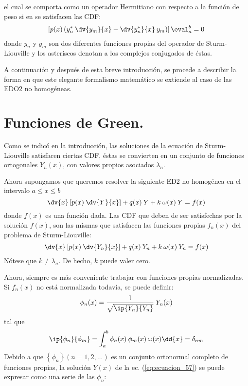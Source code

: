 el cual se comporta como un operador Hermitiano con respecto a la función de peso si en se satisfacen las CDF:
 \begin{align*}
\left[ p(x) \left( y_{n}^{*} \: \dv{y_{m}}{x} - \dv{y_{n}^{*}}{x} \: y_{m} \right) \right]\eval_{a}^{b} = 0
 \end{align*}
 donde $y_{n}$ y $y_{m}$ son dos diferentes funciones propias del operador de Sturm-Liouville y los asteriscos denotan a los complejos conjugados de éstas.
\par
A continuación y después de esta breve introducción, se procede a describir la forma en que este elegante formalismo matemático se extiende al caso de las EDO2 no homogéneas.

\section{Funciones de Green.}
Como se indicó en la introducción, las soluciones de la ecuación de Sturm-Liouville satisfacen ciertas CDF, éstas se convierten en un conjunto de funciones ortogonales $Y_{n} (x)$, con valores propios asociados $\lambda_{n}$.
\par
Ahora supongamos que queremos resolver la siguiente ED2 no homogénea en el intervalo $a \leq x \leq b$
\begin{equation}
\dv{x} \left[ p(x) \: \dv{Y}{x} \right] + q(x) \: Y + k \: \omega(x) \: Y = f(x)
\label{eq:ecuacion_57}
\end{equation}
donde $f(x)$ es una función dada. Las CDF que deben de ser satisfechas por la solución $f(x)$, son las mismas que  satisfacen las funciones propias $f_{n} (x)$ del problema de Sturm-Liouville:
\begin{align*}
\dv{x} \left[ p(x) \: \dv{Y_{n}}{x} \right] + q(x) \: Y_{n} + k \: \omega(x) \: Y_{n} = f(x)
\end{align*}
Nótese que $k \neq \lambda_{n}$. De hecho, $k$ puede valer cero.
\par
Ahora, siempre es más conveniente trabajar con funciones propias normalizadas. Si $f_{n} (x)$ no está normalizada todavía, se puede definir:
\begin{align*}
\phi_{n} (x) = \dfrac{1}{\sqrt{\ip{Y_{n}}{Y_{n}}}} \: Y_{n} (x)
\end{align*}
tal que
\begin{align*}
\ip{\phi_{n}}{\phi_{m}} = \int_{a}^{b} \phi_{n} (x) \: \phi_{m} (x) \: \omega (x) \dd{x} = \delta_{nm} 
\end{align*}
Debido a que  $\left\{ \phi_{n} \right\}(n = 1, 2, \ldots)$ es un conjunto ortonormal completo de funciones propias, la solución $Y(x)$ de la ec. (\ref{eq:ecuacion_57}) se puede  expresar como una serie de las $\phi_{n}$:
